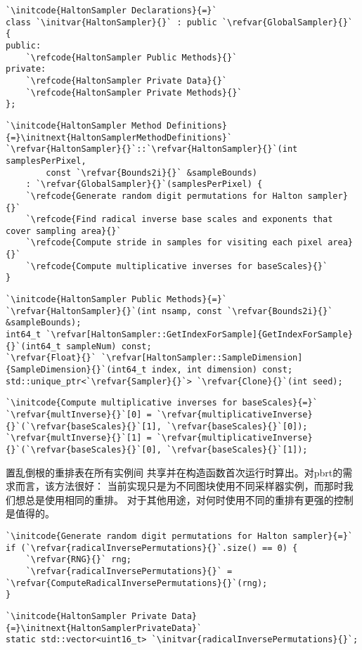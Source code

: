 \begin{lstlisting}
`\initcode{HaltonSampler Declarations}{=}`
class `\initvar{HaltonSampler}{}` : public `\refvar{GlobalSampler}{}` {
public:
    `\refcode{HaltonSampler Public Methods}{}`
private:
    `\refcode{HaltonSampler Private Data}{}`
    `\refcode{HaltonSampler Private Methods}{}`
};
\end{lstlisting}
\begin{lstlisting}
`\initcode{HaltonSampler Method Definitions}{=}\initnext{HaltonSamplerMethodDefinitions}`
`\refvar{HaltonSampler}{}`::`\refvar{HaltonSampler}{}`(int samplesPerPixel,
        const `\refvar{Bounds2i}{}` &sampleBounds)
    : `\refvar{GlobalSampler}{}`(samplesPerPixel) {
    `\refcode{Generate random digit permutations for Halton sampler}{}`
    `\refcode{Find radical inverse base scales and exponents that cover sampling area}{}`
    `\refcode{Compute stride in samples for visiting each pixel area}{}`
    `\refcode{Compute multiplicative inverses for baseScales}{}`
}
\end{lstlisting}
\begin{lstlisting}
`\initcode{HaltonSampler Public Methods}{=}`
`\refvar{HaltonSampler}{}`(int nsamp, const `\refvar{Bounds2i}{}` &sampleBounds);
int64_t `\refvar[HaltonSampler::GetIndexForSample]{GetIndexForSample}{}`(int64_t sampleNum) const;
`\refvar{Float}{}` `\refvar[HaltonSampler::SampleDimension]{SampleDimension}{}`(int64_t index, int dimension) const;
std::unique_ptr<`\refvar{Sampler}{}`> `\refvar{Clone}{}`(int seed);
\end{lstlisting}
\begin{lstlisting}
`\initcode{Compute multiplicative inverses for baseScales}{=}`
`\refvar{multInverse}{}`[0] = `\refvar{multiplicativeInverse}{}`(`\refvar{baseScales}{}`[1], `\refvar{baseScales}{}`[0]);
`\refvar{multInverse}{}`[1] = `\refvar{multiplicativeInverse}{}`(`\refvar{baseScales}{}`[0], `\refvar{baseScales}{}`[1]);
\end{lstlisting}

置乱倒根的重排表在所有实例间
共享并在构造函数首次运行时算出。对pbrt的需求而言，该方法很好：
当前实现只是为不同图块使用不同采样器实例，而那时我们想总是使用相同的重排。
对于其他用途，对何时使用不同的重排有更强的控制是值得的。
\begin{lstlisting}
`\initcode{Generate random digit permutations for Halton sampler}{=}`
if (`\refvar{radicalInversePermutations}{}`.size() == 0) {
    `\refvar{RNG}{}` rng;
    `\refvar{radicalInversePermutations}{}` = `\refvar{ComputeRadicalInversePermutations}{}`(rng);
}
\end{lstlisting}
\begin{lstlisting}
`\initcode{HaltonSampler Private Data}{=}\initnext{HaltonSamplerPrivateData}`
static std::vector<uint16_t> `\initvar{radicalInversePermutations}{}`;
\end{lstlisting}

